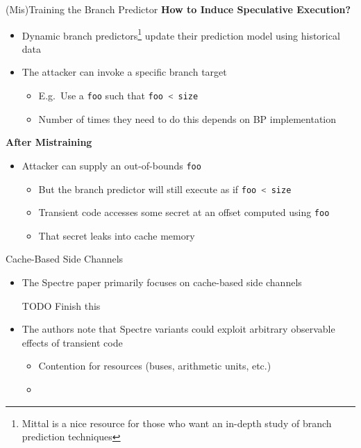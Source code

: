 \documentclass[10pt, dvipsnames, aspectratio=169]{beamer}
\let\lsi\lstinline
\newcommand{\code}[1]{\lsi[language=c]|#1|}
\begin{document}
\begin{frame}[c]{(Mis)Training the Branch Predictor}{}
  {\bf How to Induce Speculative Execution?}
  \begin{itemize}
    \item Dynamic branch predictors\footnote{Mittal \cite{mittal2019_branch_prediction} is a nice resource for those who want an in-depth study of branch prediction techniques} update their prediction model using historical data
    \item The attacker can invoke a specific branch target
    \begin{itemize}
      \item E.g.~Use a \code{foo} such that \code{foo < size}
      \item Number of times they need to do this depends on BP implementation
    \end{itemize}
  \end{itemize}

  \vfill
  {\bf After Mistraining}
  \begin{itemize}
    \item Attacker can supply an out-of-bounds \code{foo}
    \begin{itemize}
      \item But the branch predictor will still execute as if \code{foo < size}
      \item Transient code accesses some secret at an offset computed using \code{foo}
      \item That secret leaks into cache memory
    \end{itemize}
  \end{itemize}
\end{frame}

\begin{frame}[c]{Cache-Based Side Channels}
  \begin{itemize}
    \item The Spectre paper primarily focuses on cache-based side channels

    TODO Finish this

    \vfill
    \item The authors note that Spectre variants could exploit arbitrary observable effects of transient code
    \begin{itemize}
      \item Contention for resources (buses, arithmetic units, etc.)
      \item
    \end{itemize}
  \end{itemize}
\end{frame}
\end{document}
